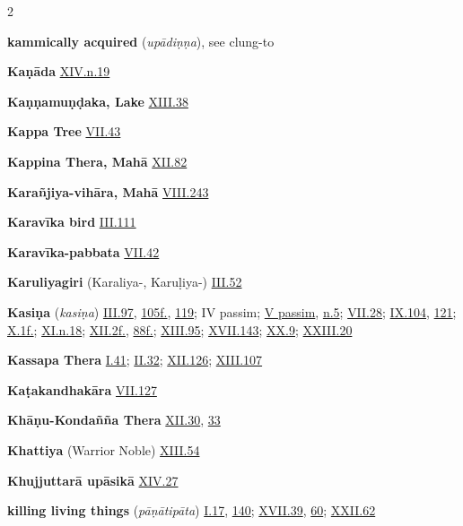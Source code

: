 \begin{multicols}{2}
\begin{vismHanging}
\par\textbf{kammically acquired} (\emph{upādiṇṇa}), see clung-to 
\par\textbf{Kaṇāda} \hyperlink{XIV.n19}{XIV.n.19}{}
\par\textbf{Kaṇṇamuṇḍaka, Lake} \hyperlink{XIII.38}{XIII.38}{}
\par\textbf{Kappa Tree} \hyperlink{VII.43}{VII.43}{}
\par\textbf{Kappina Thera, Mahā} \hyperlink{XII.82}{XII.82}{}
\par\textbf{Karañjiya-vihāra, Mahā} \hyperlink{VIII.243}{VIII.243}{}
\par\textbf{Karavīka bird} \hyperlink{III.111}{III.111}{}
\par\textbf{Karavīka-pabbata} \hyperlink{VII.42}{VII.42}{}
\par\textbf{Karuliyagiri} (Karaliya-, Karuḷiya-) \hyperlink{III.52}{III.52}{}
\par\textbf{Kasiṇa} (\emph{kasiṇa}) \hyperlink{III.97}{III.97}{}, \hyperlink{III.105}{105f.}{}, \hyperlink{III.119}{119}{}; IV passim; \hyperlink{V}{V passim}{}, \hyperlink{V.n5}{n.5}{}; \hyperlink{VII.28}{VII.28}{}; \hyperlink{IX.104}{IX.104}{}, \hyperlink{IX.121}{121}{}; \hyperlink{X.1}{X.1f.}{}; \hyperlink{XI.n18}{XI.n.18}{}; \hyperlink{XII.2}{XII.2f.}{}, \hyperlink{XII.88}{88f.}{}; \hyperlink{XIII.95}{XIII.95}{}; \hyperlink{XVII.143}{XVII.143}{}; \hyperlink{XX.9}{XX.9}{}; \hyperlink{XXIII.20}{XXIII.20}{}
\par\textbf{Kassapa Thera} \hyperlink{I.41}{I.41}{}; \hyperlink{II.32}{II.32}{}; \hyperlink{XII.126}{XII.126}{}; \hyperlink{XIII.107}{XIII.107}{}
\par\textbf{Kaṭakandhakāra} \hyperlink{VII.127}{VII.127}{}
\par\textbf{Khāṇu-Kondañña Thera} \hyperlink{XII.30}{XII.30}{}, \hyperlink{XII.33}{33}{}
\par\textbf{Khattiya} (Warrior Noble) \hyperlink{XIII.54}{XIII.54}{}
\par\textbf{Khujjuttarā upāsikā} \hyperlink{XIV.27}{XIV.27}{}
\par\textbf{killing living things} (\emph{pāṇātipāta}) \hyperlink{I.17}{I.17}{}, \hyperlink{I.140}{140}{}; \hyperlink{XVII.39}{XVII.39}{}, \hyperlink{XVII.60}{60}{}; \hyperlink{XXII.62}{XXII.62}{}

\end{vismHanging}
\end{multicols}
